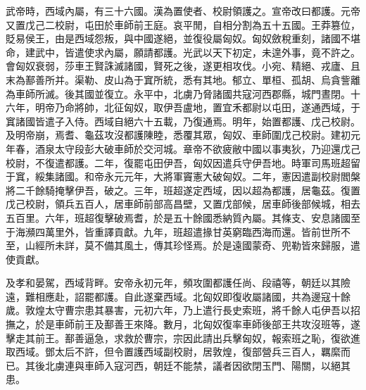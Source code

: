 
\begin{pinyinscope}
武帝時，西域內屬，有三十六國。漢為置使者、校尉領護之。宣帝改曰都護。元帝又置戊己二校尉，屯田於車師前王庭。哀平閒，自相分割為五十五國。王莽篡位，貶易侯王，由是西域怨叛，與中國遂絕，並復役屬匈奴。匈奴斂稅重刻，諸國不堪命，建武中，皆遣使求內屬，願請都護。光武以天下初定，未遑外事，竟不許之。會匈奴衰弱，莎車王賢誅滅諸國，賢死之後，遂更相攻伐。小宛、精絕、戎廬、且末為鄯善所并。渠勒、皮山為于窴所統，悉有其地。郁立、單桓、孤胡、烏貪訾離為車師所滅。後其國並復立。永平中，北虜乃脅諸國共寇河西郡縣，城門晝閉。十六年，明帝乃命將帥，北征匈奴，取伊吾盧地，置宜禾都尉以屯田，遂通西域，于窴諸國皆遣子入侍。西域自絕六十五載，乃復通焉。明年，始置都護、戊己校尉。及明帝崩，焉耆、龜茲攻沒都護陳睦，悉覆其眾，匈奴、車師圍戊己校尉。建初元年春，酒泉太守段彭大破車師於交河城。章帝不欲疲敝中國以事夷狄，乃迎還戊己校尉，不復遣都護。二年，復罷屯田伊吾，匈奴因遣兵守伊吾地。時軍司馬班超留于窴，綏集諸國。和帝永元元年，大將軍竇憲大破匈奴。二年，憲因遣副校尉閻槃將二千餘騎掩擊伊吾，破之。三年，班超遂定西域，因以超為都護，居龜茲。復置戊己校尉，領兵五百人，居車師前部高昌壁，又置戊部候，居車師後部候城，相去五百里。六年，班超復擊破焉耆，於是五十餘國悉納質內屬。其條支、安息諸國至于海瀕四萬里外，皆重譯貢獻。九年，班超遣掾甘英窮臨西海而還。皆前世所不至，山經所未詳，莫不備其風土，傳其珍怪焉。於是遠國蒙奇、兜勒皆來歸服，遣使貢獻。

及孝和晏駕，西域背畔。安帝永初元年，頻攻圍都護任尚、段禧等，朝廷以其險遠，難相應赴，詔罷都護。自此遂棄西域。北匈奴即復收屬諸國，共為邊寇十餘歲。敦煌太守曹宗患其暴害，元初六年，乃上遣行長史索班，將千餘人屯伊吾以招撫之，於是車師前王及鄯善王來降。數月，北匈奴復率車師後部王共攻沒班等，遂擊走其前王。鄯善逼急，求救於曹宗，宗因此請出兵擊匈奴，報索班之恥，復欲進取西域。鄧太后不許，但令置護西域副校尉，居敦煌，復部營兵三百人，羈縻而已。其後北虜連與車師入寇河西，朝廷不能禁，議者因欲閉玉門、陽關，以絕其患。


\end{pinyinscope}
